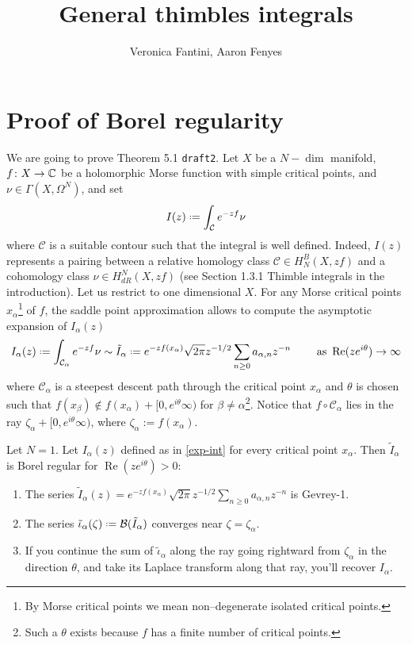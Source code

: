 \documentclass[11pt,a4paper,twoside,leqno,noamsfonts]{amsart}
\title[General thimbles integrals]{General thimbles integrals\\ [1ex]
  }
\author{
Veronica Fantini, Aaron Fenyes
}
\numberwithin{equation}{section}
\begin{document}
\maketitle


\section{Proof of Borel regularity}

We are going to prove Theorem 5.1 {\tt draft2}. 
Let $X$ be a $N-\dim$ manifold, $f\colon X\to\mathbb C$ be a holomorphic Morse function with simple critical points, and $\nu\in\Gamma(X,\Omega^N)$, and set
\begin{equation}
I(z)\defeq\int_{\mathcal{C}}e^{-zf}\nu
\end{equation}
where $\mathcal{C}$ is a suitable contour such that the integral is well defined. Indeed, $I(z)$ represents a pairing between a relative homology class $\mathcal{C}\in H_{N}^{B}(X,zf)$ and a cohomology class $\nu\in H_{dR}^N(X,zf)$ (see Section 1.3.1 Thimble integrals in the introduction). 
Let us restrict to one dimensional $X$. For any Morse critical points $x_\alpha$\footnote{By Morse critical points we mean non--degenerate isolated critical points.} of $f$, the saddle point approximation allows to compute the asymptotic expansion of $I_\alpha(z)$ 
\begin{equation}\label{exp-int}
I_{\alpha}(z)\defeq\int_{\mathcal{C}_\alpha}e^{-zf}\nu\sim \tilde{I}_{\alpha}\defeq e^{-zf(x_\alpha)}\sqrt{2\pi} z^{-1/2}\sum_{n\geq 0}a_{\alpha,n}z^{-n} \qquad \text{ as } \operatorname{Re} (ze^{i\theta})\to\infty
\end{equation}
where $\mathcal{C}_\alpha$ is a steepest descent path through the critical point $x_\alpha$ and $\theta$ is chosen such that $f(x_\beta)\notin f(x_\alpha)+[0,e^{i\theta}\infty)$ for $\beta\neq\alpha$\footnote{Such a $\theta$ exists because $f$ has a finite number of critical points.}. Notice that $f \circ \mathcal{C}_\alpha$ lies in the ray $\zeta_\alpha +[0, e^{i\theta}\infty)$, where $\zeta_\alpha := f(x_\alpha)$.

\begin{theorem}\label{thm:maxim} Let $N=1$. Let ${I}_{\alpha}(z)$ defined as in \eqref{exp-int} for every critical point $x_\alpha$. Then $\tilde{I}_\alpha$ is Borel regular for $\operatorname{Re}(ze^{i\theta})>0$:
\begin{enumerate}
\item\label{int:series-gevrey} The series $\tilde{I}_\alpha(z)=e^{-zf(x_\alpha)}\sqrt{2\pi} z^{-1/2}\sum_{n\geq 0}a_{\alpha,n}z^{-n}$ is Gevrey-1.
\item\label{int:resum-converges} The series $\tilde{\iota}_\alpha(\zeta)\defeq\mathcal{B}(\tilde{I}_\alpha)$ converges near $\zeta=\zeta_{\alpha}$.
\item\label{int:resum-valid} If you continue the sum of $\tilde{\iota}_\alpha$ along the ray going rightward from $\zeta_\alpha$ in the direction $\theta$, and take its Laplace transform along that ray, you'll recover $I_\alpha$.
\end{enumerate}
\end{theorem}
\end{document}
